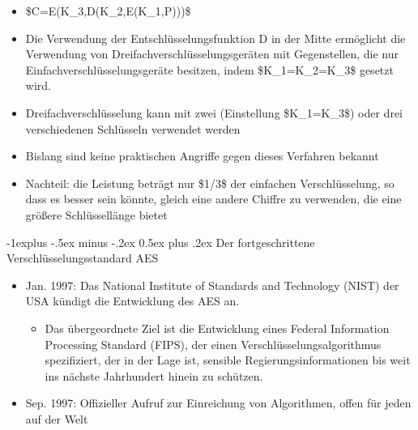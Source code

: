 \documentclass[a4paper]{article}
\makeatletter
\renewcommand{\subsection}{\@startsection{subsection}{2}{0mm}%
 {-1explus -.5ex minus -.2ex}%
 {0.5ex plus .2ex}%
 {\normalfont\normalsize\bfseries}}
\makeatother
\begin{document}
\begin{multicols}{3}
\begin{itemize}
              \begin{itemize}
                  \item
                        \$C=E(K\_3,D(K\_2,E(K\_1,P)))\$
                  \item
                        Die Verwendung der Entschlüsselungsfunktion D in der Mitte
                        ermöglicht die Verwendung von Dreifachverschlüsselungsgeräten mit
                        Gegenstellen, die nur Einfachverschlüsselungsgeräte besitzen, indem
                        \$K\_1=K\_2=K\_3\$ gesetzt wird.
                  \item
                        Dreifachverschlüsselung kann mit zwei (Einstellung \$K\_1=K\_3\$)
                        oder drei verschiedenen Schlüsseln verwendet werden
                  \item
                        Bislang sind keine praktischen Angriffe gegen dieses Verfahren
                        bekannt
                  \item
                        Nachteil: die Leistung beträgt nur \$1/3\$ der einfachen
                        Verschlüsselung, so dass es besser sein könnte, gleich eine andere
                        Chiffre zu verwenden, die eine größere Schlüssellänge bietet
              \end{itemize}
    \end{itemize}


    \subsection{Der fortgeschrittene Verschlüsselungsstandard
        AES}

    \begin{itemize}
        \item
              Jan. 1997: Das National Institute of Standards and Technology (NIST)
              der USA kündigt die Entwicklung des AES an.

              \begin{itemize}
                  \item
                        Das übergeordnete Ziel ist die Entwicklung eines Federal Information
                        Processing Standard (FIPS), der einen Verschlüsselungsalgorithmus
                        spezifiziert, der in der Lage ist, sensible Regierungsinformationen
                        bis weit ins nächste Jahrhundert hinein zu schützen.
              \end{itemize}
        \item
              Sep. 1997: Offizieller Aufruf zur Einreichung von Algorithmen, offen
              für jeden auf der Welt


\end{itemize}
\end{multicols}
\end{document}
